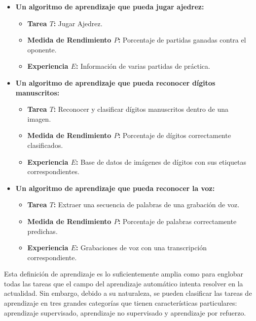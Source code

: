     \begin{itemize}
        \item \textbf{Un algoritmo de aprendizaje que pueda jugar ajedrez:}
        \begin{itemize}
            \item \textbf{Tarea $T$:} Jugar Ajedrez.
            \item \textbf{Medida de Rendimiento $P$:} Porcentaje de partidas ganadas contra el oponente.
            \item \textbf{Experiencia $E$:} Información de varias partidas de práctica.
        \end{itemize}
        
        \item \textbf{Un algoritmo de aprendizaje que pueda reconocer dígitos manuscritos:}
        \begin{itemize}
            \item \textbf{Tarea $T$:} Reconocer y clasificar dígitos manuscritos dentro de una imagen.
            \item \textbf{Medida de Rendimiento $P$:} Porcentaje de dígitos correctamente clasificados.
            \item \textbf{Experiencia $E$:} Base de datos de imágenes de dígitos con sus etiquetas correspondientes.
        \end{itemize}

        \item \textbf{Un algoritmo de aprendizaje que pueda reconocer la voz:}
        \begin{itemize}
            \item \textbf{Tarea $T$:} Extraer una secuencia de palabras de una grabación de voz.
            \item \textbf{Medida de Rendimiento $P$:} Porcentaje de palabras correctamente predichas.
            \item \textbf{Experiencia $E$:} Grabaciones de voz con una transcripción correspondiente.
        \end{itemize}
    
    \end{itemize}
    

    Esta definición de aprendizaje es lo suficientemente amplia como para englobar todas las tareas 
    que el campo del aprendizaje automático intenta resolver en la actualidad. Sin embargo, debido a 
    su naturaleza, se pueden clasificar las tareas de aprendizaje en tres grandes categorías que tienen
    características particulares: aprendizaje supervisado, aprendizaje no supervisado y aprendizaje por refuerzo.

